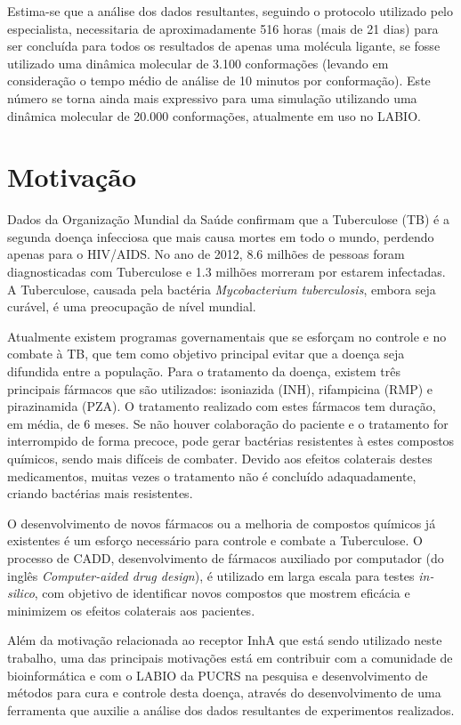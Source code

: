 Estima-se que a análise dos dados resultantes, seguindo o protocolo utilizado pelo especialista, necessitaria de aproximadamente 516 horas (mais de 21 dias) para ser concluída para todos os resultados de apenas uma molécula ligante, se fosse utilizado uma dinâmica molecular de 3.100 conformações (levando em consideração o tempo médio de análise de 10 minutos por conformação). Este número se torna ainda mais expressivo para uma simulação utilizando uma dinâmica molecular de 20.000 conformações, atualmente em uso no LABIO.


\section{Motivação}

Dados da Organização Mundial da Saúde confirmam que a Tuberculose (TB) é a segunda doença infecciosa que mais causa mortes em todo o mundo, perdendo apenas para o HIV/AIDS. No ano de 2012, 8.6 milhões de pessoas foram diagnosticadas com Tuberculose e 1.3 milhões morreram por estarem infectadas. A Tuberculose, causada pela bactéria \emph{Mycobacterium tuberculosis}, embora seja curável, é uma preocupação de nível mundial.

Atualmente existem programas governamentais que se esforçam no controle e no combate à TB, que tem como objetivo principal evitar que a doença seja difundida entre a população. Para o tratamento da doença, existem três principais fármacos que são utilizados: isoniazida (INH), rifampicina (RMP) e pirazinamida (PZA). O tratamento realizado com estes fármacos tem duração, em média, de 6 meses. Se não houver colaboração do paciente e o tratamento for interrompido de forma precoce, pode gerar bactérias resistentes à estes compostos químicos, sendo mais difíceis de combater. Devido aos efeitos colaterais destes medicamentos, muitas vezes o tratamento não é concluído adaquadamente, criando bactérias mais resistentes.

O desenvolvimento de novos fármacos ou a melhoria de compostos químicos já existentes é um esforço necessário para controle e combate a Tuberculose. O processo de CADD, desenvolvimento de fármacos auxiliado por computador (do inglês \emph{Computer-aided drug design}), é utilizado em larga escala para testes \emph{in-silico}, com objetivo de identificar novos compostos que mostrem eficácia e minimizem os efeitos colaterais aos pacientes.

Além da motivação relacionada ao receptor InhA que está sendo utilizado neste trabalho, uma das principais motivações está em contribuir com a comunidade de bioinformática e com o LABIO da PUCRS na pesquisa e desenvolvimento de métodos para cura e controle desta doença, através do desenvolvimento de uma ferramenta que auxilie a análise dos dados resultantes de experimentos realizados. 


